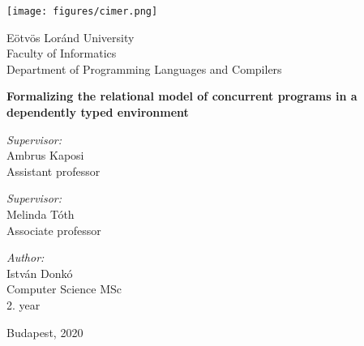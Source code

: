 \documentclass[runningheads,a4paper]{report}
\theoremstyle{definition}
\begin{document}


\begin{titlepage}
  \noindent
  \begin{minipage}{0.25 \textwidth}
    \texttt{[image: figures/cimer.png]}
  \end{minipage}
  \hfill
  \begin{minipage}{0.67 \textwidth}
    \large
    Eötvös Loránd University \\
    Faculty of Informatics \\
    Department of Programming Languages and Compilers \\
    
  \end{minipage}

  \vfill

  \begin{center}
    {\LARGE \bfseries Formalizing the relational model of concurrent programs in a dependently typed environment}
    \\[6cm]
    \begin{minipage}[t]{0.45 \textwidth}
      \emph{Supervisor:} \\[0.25 \baselineskip]
      {\large Ambrus Kaposi} \\[0.5 \baselineskip]
      Assistant professor
      \vspace{1cm}
      
      \emph{Supervisor:} \\[0.25 \baselineskip]
      {\large Melinda Tóth} \\[0.5 \baselineskip]
      Associate professor
    \end{minipage}
    \begin{minipage}[t]{0.45 \textwidth}
      \begin{flushright}
        \emph{Author:} \\[0.25 \baselineskip]
        {\large István Donkó} \\[0.5 \baselineskip]
        Computer Science MSc \\ %
        2. year
      \end{flushright}
    \end{minipage}
  \end{center}

  \vfill

  \begin{center}
    \large Budapest, 2020
  \end{center}
\end{titlepage}
\end{document}
